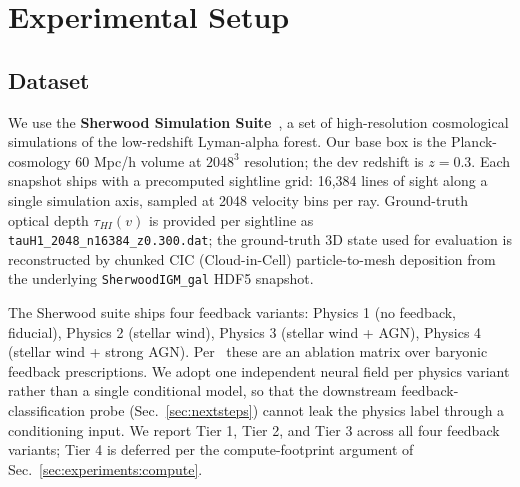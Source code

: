 \section{Experimental Setup}
\label{sec:experiments}

\subsection{Dataset}
We use the \textbf{Sherwood Simulation Suite}~\cite{bolton2017sherwood}, a set of high-resolution cosmological simulations of the low-redshift Lyman-alpha forest. Our base box is the Planck-cosmology 60 Mpc/h volume at $2048^3$ resolution; the dev redshift is $z = 0.3$. Each snapshot ships with a precomputed sightline grid: 16{,}384 lines of sight along a single simulation axis, sampled at 2048 velocity bins per ray. Ground-truth optical depth $\tau_{HI}(v)$ is provided per sightline as \texttt{tauH1\_2048\_n16384\_z0.300.dat}; the ground-truth 3D state used for evaluation is reconstructed by chunked CIC (Cloud-in-Cell) particle-to-mesh deposition from the underlying \texttt{SherwoodIGM\_gal} HDF5 snapshot.

The Sherwood suite ships four feedback variants: Physics 1 (no feedback, fiducial), Physics 2 (stellar wind), Physics 3 (stellar wind + AGN), Physics 4 (stellar wind + strong AGN). Per~\cite{bolton2017sherwood} these are an ablation matrix over baryonic feedback prescriptions. We adopt one independent neural field per physics variant rather than a single conditional model, so that the downstream feedback-classification probe (Sec.~\ref{sec:nextsteps}) cannot leak the physics label through a conditioning input. We report Tier 1, Tier 2, and Tier 3 across all four feedback variants; Tier 4 is deferred per the compute-footprint argument of Sec.~\ref{sec:experiments:compute}.

